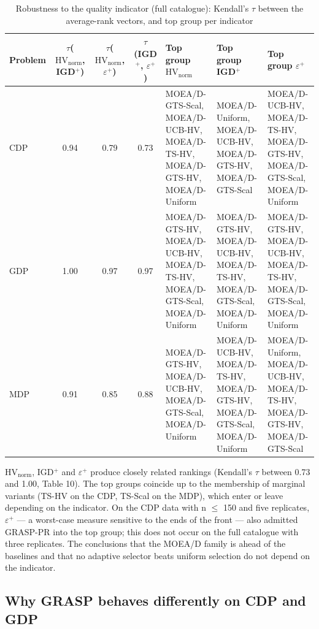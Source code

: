 \begin{table}[t]
\centering
\scriptsize
\setlength{\tabcolsep}{4pt}
\caption{Robustness to the quality indicator (full catalogue): Kendall's $\tau$ between the average-rank vectors, and top group per indicator}\label{tab:10}
\begin{tabularx}{\linewidth}{lcccXXX}
\toprule
Problem & $\tau$($\mathrm{HV}_{\mathrm{norm}}$, IGD$^{+}$) & $\tau$($\mathrm{HV}_{\mathrm{norm}}$, $\varepsilon^{+}$) & $\tau$(IGD$^{+}$, $\varepsilon^{+}$) & Top group $\mathrm{HV}_{\mathrm{norm}}$ & Top group IGD$^{+}$ & Top group $\varepsilon^{+}$ \\
\midrule
CDP & 0.94 & 0.79 & 0.73 & MOEA/D-GTS-Scal, MOEA/D-UCB-HV, MOEA/D-TS-HV, MOEA/D-GTS-HV, MOEA/D-Uniform & MOEA/D-Uniform, MOEA/D-UCB-HV, MOEA/D-GTS-HV, MOEA/D-GTS-Scal & MOEA/D-UCB-HV, MOEA/D-TS-HV, MOEA/D-GTS-HV, MOEA/D-GTS-Scal, MOEA/D-Uniform \\
GDP & 1.00 & 0.97 & 0.97 & MOEA/D-GTS-HV, MOEA/D-UCB-HV, MOEA/D-TS-HV, MOEA/D-GTS-Scal, MOEA/D-Uniform & MOEA/D-GTS-HV, MOEA/D-UCB-HV, MOEA/D-TS-HV, MOEA/D-GTS-Scal, MOEA/D-Uniform & MOEA/D-GTS-HV, MOEA/D-UCB-HV, MOEA/D-TS-HV, MOEA/D-GTS-Scal, MOEA/D-Uniform \\
MDP & 0.91 & 0.85 & 0.88 & MOEA/D-GTS-HV, MOEA/D-UCB-HV, MOEA/D-GTS-Scal, MOEA/D-Uniform & MOEA/D-UCB-HV, MOEA/D-TS-HV, MOEA/D-GTS-HV, MOEA/D-GTS-Scal, MOEA/D-Uniform & MOEA/D-Uniform, MOEA/D-UCB-HV, MOEA/D-TS-HV, MOEA/D-GTS-HV, MOEA/D-GTS-Scal \\
\bottomrule
\end{tabularx}
\end{table}

$\mathrm{HV}_{\mathrm{norm}}$, IGD$^{+}$ and $\varepsilon$$^{+}$ produce closely related rankings (Kendall's $\tau$ between 0.73 and 1.00, Table 10). The top groups coincide up to the membership of marginal variants (TS-HV on the CDP, TS-Scal on the MDP), which enter or leave depending on the indicator. On the CDP data with n $\leq$ 150 and five replicates, $\varepsilon$$^{+}$ --- a worst-case measure sensitive to the ends of the front --- also admitted GRASP-PR into the top group; this does not occur on the full catalogue with three replicates. The conclusions that the MOEA/D family is ahead of the baselines and that no adaptive selector beats uniform selection do not depend on the indicator.

\subsection{Why GRASP behaves differently on CDP and GDP}\label{sec:why_grasp_behaves_differentl}


